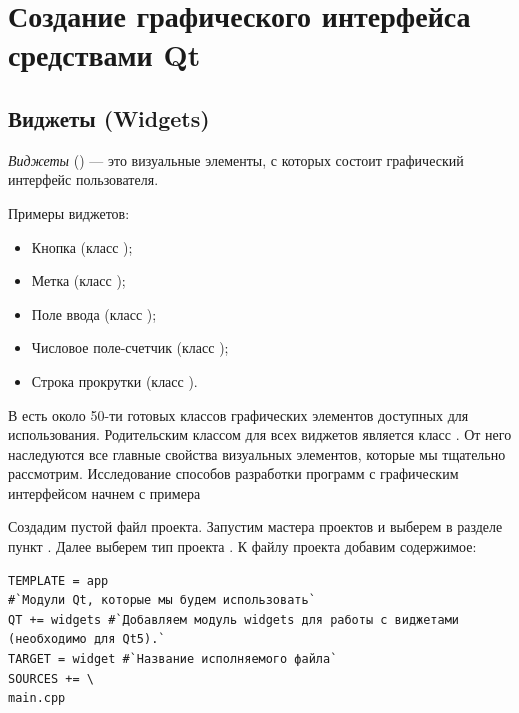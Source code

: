 \chapter[Создание графического интерфейса средствами Qt]{Создание графического интерфейса средствами Qt}
\section[Виджеты (Widgets)]{Виджеты (Widgets)}
\emph{Виджеты} () --- это визуальные элементы, с которых состоит графический интерфейс
пользователя.

Примеры виджетов:

\begin{itemize}
\item Кнопка (класс );
\item Метка (класс );
\item Поле ввода (класс );
\item Числовое поле-счетчик (класс );
\item Строка прокрутки (класс ).
\end{itemize}

В  есть около 50-ти готовых классов графических элементов доступных для использования. Родительским классом для всех
виджетов является  класс . От него наследуются все главные свойства визуальных
элементов, которые мы тщательно рассмотрим. Исследование способов разработки программ с графическим интерфейсом начнем
с примера

Создадим пустой файл проекта. Запустим мастера проектов и выберем в разделе
 пункт . Далее выберем тип проекта
. К файлу проекта добавим содержимое:
\begin{lstlisting}
TEMPLATE = app
#`Модули Qt, которые мы будем использовать`
QT += widgets #`Добавляем модуль widgets для работы с виджетами (необходимо для Qt5).`
TARGET = widget #`Название исполняемого файла`
SOURCES += \
main.cpp
\end{lstlisting}

